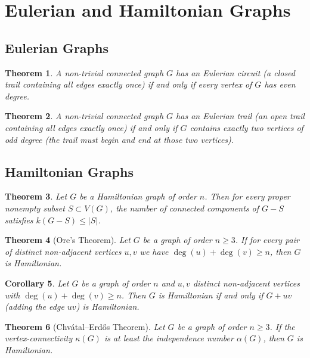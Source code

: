 \documentclass{article}
\newtheorem{theorem}{Theorem}[section]
\newtheorem{corollary}[theorem]{Corollary}
\begin{document}
\section{Eulerian and Hamiltonian Graphs}

\subsection{Eulerian Graphs}
\begin{theorem}
A non-trivial connected graph $G$ has an Eulerian circuit (a closed trail containing all edges exactly once) if and only if every vertex of $G$ has even degree.
\end{theorem}

\begin{theorem}
A non-trivial connected graph $G$ has an Eulerian trail (an open trail containing all edges exactly once) if and only if $G$ contains exactly two vertices of odd degree (the trail must begin and end at those two vertices).
\end{theorem}

\subsection{Hamiltonian Graphs}
\begin{theorem}
Let $G$ be a Hamiltonian graph of order $n$. Then for every proper nonempty subset $S\subset V(G)$, the number of connected components of $G-S$ satisfies $k(G-S)\le |S|$.
\end{theorem}

\begin{theorem}[Ore's Theorem]
Let $G$ be a graph of order $n\ge 3$. If for every pair of distinct non-adjacent vertices $u,v$ we have $\deg(u)+\deg(v)\ge n$, then $G$ is Hamiltonian.
\end{theorem}

\begin{corollary}
Let $G$ be a graph of order $n$ and $u,v$ distinct non-adjacent vertices with $\deg(u)+\deg(v)\ge n$. Then $G$ is Hamiltonian if and only if $G+uv$ (adding the edge $uv$) is Hamiltonian.
\end{corollary}

\begin{theorem}[Chv\'atal--Erd\H{o}s Theorem]
Let $G$ be a graph of order $n\ge 3$. If the vertex-connectivity $\kappa(G)$ is at least the independence number $\alpha(G)$, then $G$ is Hamiltonian.
\end{theorem}
\end{document}
